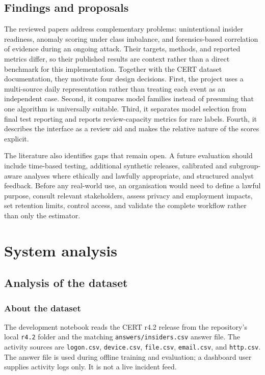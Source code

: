 \documentclass[12pt,a4paper,oneside]{report}
\newcommand{\code}[1]{\texttt{\small #1}}
\begin{document}
\section{Findings and proposals}
The reviewed papers address complementary problems: unintentional
insider readiness, anomaly scoring under class imbalance, and
forensics-based correlation of evidence during an ongoing attack.
Their targets, methods, and reported metrics differ, so their
published results are context rather than a direct benchmark for this
implementation. Together with the CERT dataset documentation, they
motivate four design decisions. First, the project uses a multi-source
daily representation rather than treating each event as an independent
case. Second, it compares model families instead of presuming that one
algorithm is universally suitable. Third, it separates model selection
from final test reporting and reports review-capacity metrics for rare
labels. Fourth, it describes the interface as a review aid and makes
the relative nature of the scores explicit.

The literature also identifies gaps that remain open. A future
evaluation should include time-based testing, additional synthetic
releases, calibrated and subgroup-aware analyses where ethically and
lawfully appropriate, and structured analyst feedback. Before any
real-world use, an organisation would need to define a lawful purpose,
consult relevant stakeholders, assess privacy and employment impacts,
set retention limits, control access, and validate the complete
workflow rather than only the estimator.

\chapter{System analysis}
\label{chap:analysis}

\section{Analysis of the dataset}

\subsection{About the dataset}
The development notebook reads the CERT r4.2 release from the
repository's local \code{r4.2} folder and the matching
\code{answers/insiders.csv} answer file. The activity sources are
\code{logon.csv}, \code{device.csv}, \code{file.csv},
\code{email.csv}, and \code{http.csv}. The answer file is used during
offline training and evaluation; a dashboard user supplies activity
logs only. It is not a live incident feed.
\end{document}
